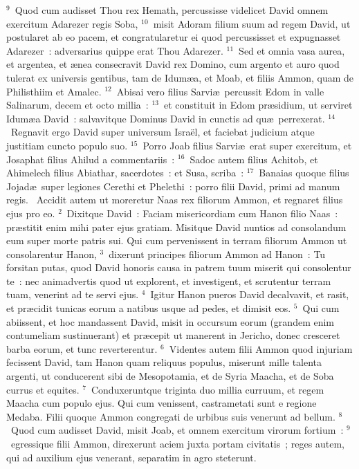${}^{9}$~Quod cum audisset Thou rex Hemath, percussisse videlicet David omnem exercitum Adarezer regis Soba,
${}^{10}$~misit Adoram filium suum ad regem David, ut postularet ab eo pacem, et congratularetur ei quod percussisset et expugnasset Adarezer~: adversarius quippe erat Thou Adarezer.
${}^{11}$~Sed et omnia vasa aurea, et argentea, et \ae nea consecravit David rex Domino, cum argento et auro quod tulerat ex universis gentibus, tam de Idum\ae a, et Moab, et filiis Ammon, quam de Philisthiim et Amalec.
${}^{12}$~Abisai vero filius Sarvi\ae\ percussit Edom in valle Salinarum, decem et octo millia~:
${}^{13}$~et constituit in Edom pr\ae sidium, ut serviret Idum\ae a David~: salvavitque Dominus David in cunctis ad qu\ae\ perrexerat.
${}^{14}$~Regnavit ergo David super universum Isra\"el, et faciebat judicium atque justitiam cuncto populo suo.
${}^{15}$~Porro Joab filius Sarvi\ae\ erat super exercitum, et Josaphat filius Ahilud a commentariis~:
${}^{16}$~Sadoc autem filius Achitob, et Ahimelech filius Abiathar, sacerdotes~: et Susa, scriba~:
${}^{17}$~Banaias quoque filius Jojad\ae\ super legiones Cerethi et Phelethi~: porro filii David, primi ad manum regis.
~\lettrine[lines=10,image=true,loversize=0.05,lraise=-0.03]{A}{}ccidit autem ut moreretur Naas rex filiorum Ammon, et regnaret filius ejus pro eo.
${}^{2}$~Dixitque David~: Faciam misericordiam cum Hanon filio Naas~: pr\ae stitit enim mihi pater ejus gratiam. Misitque David nuntios ad consolandum eum super morte patris sui. Qui cum pervenissent in terram filiorum Ammon ut consolarentur Hanon,
${}^{3}$~dixerunt principes filiorum Ammon ad Hanon~: Tu forsitan putas, quod David honoris causa in patrem tuum miserit qui consolentur te~: nec animadvertis quod ut explorent, et investigent, et scrutentur terram tuam, venerint ad te servi ejus.
${}^{4}$~Igitur Hanon pueros David decalvavit, et rasit, et pr\ae cidit tunicas eorum a natibus usque ad pedes, et dimisit eos.
${}^{5}$~Qui cum abiissent, et hoc mandassent David, misit in occursum eorum (grandem enim contumeliam sustinuerant) et pr\ae cepit ut manerent in Jericho, donec cresceret barba eorum, et tunc reverterentur.
${}^{6}$~Videntes autem filii Ammon quod injuriam fecissent David, tam Hanon quam reliquus populus, miserunt mille talenta argenti, ut conducerent sibi de Mesopotamia, et de Syria Maacha, et de Soba currus et equites.
${}^{7}$~Conduxeruntque triginta duo millia curruum, et regem Maacha cum populo ejus. Qui cum venissent, castrametati sunt e regione Medaba. Filii quoque Ammon congregati de urbibus suis venerunt ad bellum.
${}^{8}$~Quod cum audisset David, misit Joab, et omnem exercitum virorum fortium~:
${}^{9}$~egressique filii Ammon, direxerunt aciem juxta portam civitatis~; reges autem, qui ad auxilium ejus venerant, separatim in agro steterunt.


